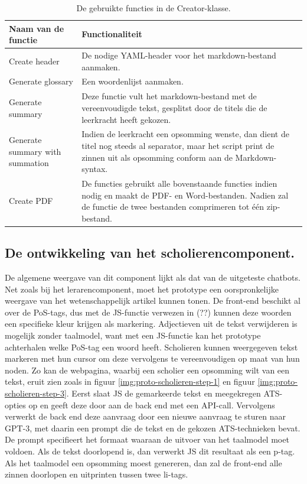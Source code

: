 \begin{table}[H]
	\begin{tabular}{ | m{5cm}| m{10cm} | }
		\hline
		Naam van de functie & Functionaliteit \\ \hline
		Create header & De nodige YAML-header voor het markdown-bestand aanmaken. \\ \hline
		Generate glossary & Een woordenlijst aanmaken. \\ \hline
		Generate summary & Deze functie vult het markdown-bestand met de vereenvoudigde tekst, gesplitst door de titels die de leerkracht heeft gekozen. \\ \hline
		Generate summary with summation & Indien de leerkracht een opsomming wenste, dan dient de titel nog steeds al separator, maar het script print de zinnen uit als opsomming conform aan de Markdown-syntax. \\ \hline
		Create PDF & De functies gebruikt alle bovenstaande functies indien nodig en maakt de PDF- en Word-bestanden. Nadien zal de functie de twee bestanden comprimeren tot één zip-bestand. \\ \hline
	\end{tabular}
	\caption{De gebruikte functies in de Creator-klasse.}
	\label{table:functions-creator-class}
\end{table}


\subsection{De ontwikkeling van het scholierencomponent.}

De algemene weergave van dit component lijkt als dat van de uitgeteste chatbots. Net zoals bij het lerarencomponent, moet het prototype een oorspronkelijke weergave van het wetenschappelijk artikel kunnen tonen. De front-end beschikt al over de PoS-tags, dus met de JS-functie verwezen in (??) kunnen deze woorden een specifieke kleur krijgen als markering. Adjectieven uit de tekst verwijderen is mogelijk zonder taalmodel, want met een JS-functie kan het prototype achterhalen welke PoS-tag een woord heeft. Scholieren kunnen weergegeven tekst markeren met hun cursor om deze vervolgens te vereenvoudigen op maat van hun noden. Zo kan de webpagina, waarbij een scholier een opsomming wilt van een tekst, eruit zien zoals in figuur \ref{img:proto-scholieren-step-1} en figuur \ref{img:proto-scholieren-step-3}. Eerst slaat JS de gemarkeerde tekst en meegekregen ATS-opties op en geeft deze door aan de back end met een API-call. Vervolgens verwerkt de back end deze aanvraag door een nieuwe aanvraag te sturen naar GPT-3, met daarin een prompt die de tekst en de gekozen ATS-technieken bevat. De prompt specifieert het formaat waaraan de uitvoer van het taalmodel moet voldoen.  Als de tekst doorlopend is, dan verwerkt JS dit resultaat als een p-tag.  Als het taalmodel een opsomming moest genereren, dan zal de front-end alle zinnen doorlopen en uitprinten tussen twee li-tags.

